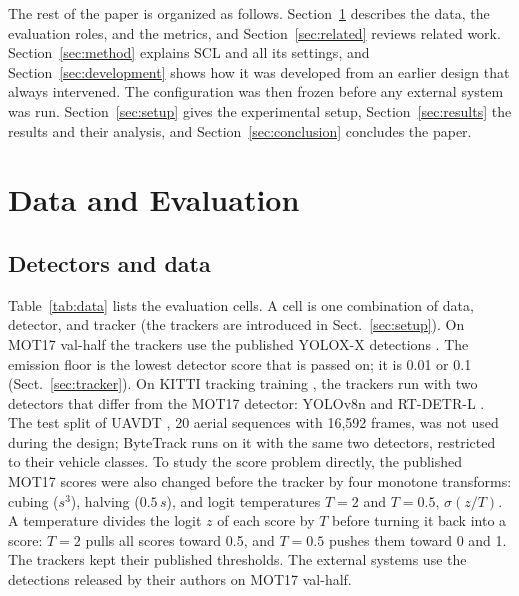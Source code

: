 \documentclass[pdflatex,referee,sn-mathphys-num]{sn-jnl}
\newcommand{\scl}{SCL}
\begin{document}
The rest of the paper is organized as follows. Section~\ref{sec:data-eval}
describes the data, the evaluation roles, and the metrics, and
Section~\ref{sec:related} reviews related work. Section~\ref{sec:method}
explains \scl{} and all its settings, and Section~\ref{sec:development} shows
how it was developed from an earlier design that always intervened. The
configuration was then frozen before any external system was run.
Section~\ref{sec:setup} gives the experimental setup,
Section~\ref{sec:results} the results and their analysis, and
Section~\ref{sec:conclusion} concludes the paper.
\section{Data and Evaluation}\label{sec:data-eval}

\subsection{Detectors and data}\label{sec:data}
Table~\ref{tab:data} lists the evaluation cells. A cell is one combination of
data, detector, and tracker (the trackers are introduced in
Sect.~\ref{sec:setup}). On MOT17 val-half \cite{milan2016mot16} the trackers
use the published YOLOX-X detections \cite{ge2021yolox}. The emission floor is
the lowest detector score that is passed on; it is 0.01 or 0.1
(Sect.~\ref{sec:tracker}). On KITTI tracking training \cite{geiger2012kitti},
the trackers run with two detectors that differ from the MOT17 detector:
YOLOv8n \cite{jocher2023yolov8} and RT-DETR-L \cite{zhao2024rtdetr}. The test
split of UAVDT \cite{du2018uavdt}, 20 aerial sequences with 16,592 frames,
was not used during the design; ByteTrack runs on it with the same two
detectors, restricted to their vehicle classes. To study
the score problem directly, the published MOT17 scores were also changed
before the tracker by four monotone transforms: cubing ($s^3$), halving ($0.5\,s$),
and logit temperatures $T=2$ and $T=0.5$, $\sigma(z/T)$. A temperature
divides the logit $z$ of each score by $T$ before turning it back into a
score: $T=2$ pulls all scores toward 0.5, and $T=0.5$ pushes them toward 0
and 1. The trackers kept their published thresholds. The external systems use the detections released
by their authors on MOT17 val-half.
\end{document}
